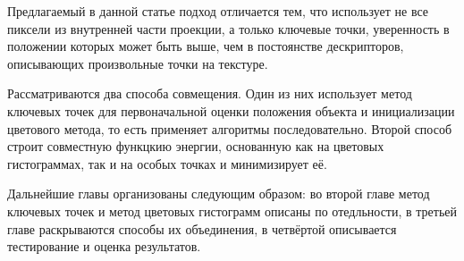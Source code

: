 
Предлагаемый в данной статье подход отличается тем, что использует не все
пиксели из внутренней части проекции, а только ключевые точки, уверенность в
положении которых может быть выше, чем в постоянстве дескрипторов, описывающих
произвольные точки на текстуре.

Рассматриваются два способа совмещения.
Один из них использует метод ключевых точек для первоначальной оценки положения
объекта и инициализации цветового метода, то есть применяет алгоритмы
последовательно.
Второй способ строит совместную функцкию энергии, основанную как на цветовых
гистограммах, так и на особых точках и минимизирует её.


Дальнейшие главы организованы следующим образом: во второй главе метод ключевых
точек и метод цветовых гистограмм описаны по отедльности, в третьей главе
раскрываются способы их объединения, в четвёртой описывается тестирование и
оценка результатов.
